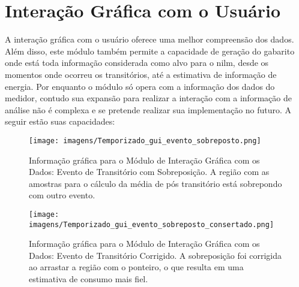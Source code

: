 \section{Interação Gráfica com o Usuário}
\label{sec:gui}

A interação gráfica com o usuário oferece uma melhor compreensão dos
dados. Além disso, este módulo também permite a capacidade de geração
do gabarito onde está toda informação considerada como alvo para o
\gls{nilm}, desde os momentos onde ocorreu os transitórios, até a
estimativa de informação de energia. Por enquanto o módulo só opera
com a informação dos dados do medidor, contudo sua expansão para
realizar a interação com a informação de análise não é complexa e
se pretende realizar sua implementação no futuro. A seguir estão
suas capacidades:

\begin{sidewaysfigure}[p]
\centering
\texttt{[image: imagens/Temporizado\_gui\_evento\_sobreposto.png]}
\caption[Informação gráfica para o Módulo de Interação Gráfica com os
Dados: Evento de Transitório com Sobreposição.]{Informação gráfica
para o Módulo de Interação Gráfica com os Dados: Evento de Transitório com
Sobreposição. A região com as amostras para o cálculo da média de pós
transitório está sobrepondo com outro evento.}
\label{fig:gui_evento_sobreposto}
\end{sidewaysfigure}

\begin{sidewaysfigure}[p]
\texttt{[image: imagens/Temporizado\_gui\_evento\_sobreposto\_consertado.png]}
\caption[Informação gráfica para o Módulo de Interação Gráfica com os
Dados: Evento de Transitório Corrigido.]{
Informação gráfica para o Módulo de Interação Gráfica com os
Dados: Evento de Transitório Corrigido. A sobreposição foi corrigida
ao arrastar a região com o ponteiro, o que resulta em uma
estimativa de consumo mais fiel.}
\label{fig:gui_evento_sobreposto_corrigido}
\end{sidewaysfigure}

